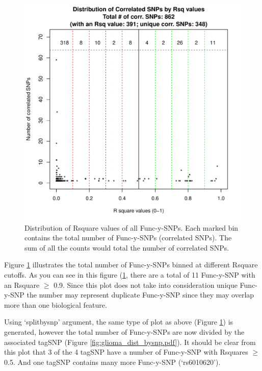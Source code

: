 \documentclass[12pt,fullpage]{article}
\begin{document}
\begin{figure}[ht!]
\begin{center}
\includegraphics{glioma_dist.pdf}
\caption{\label{fig:glioma_dist.pdf} Distribution of Rsquare values of all 
Func-y-SNPs. Each marked bin contains the total number of Func-y-SNPs
(correlated SNPs). The sum of all the counts would total the number of
correlated SNPs.}
{\footnotesize{}}
\end{center}
\end{figure}

Figure \ref{fig:glioma_dist.pdf} illustrates the total number of Func-y-SNPs
binned at different Rsquare cutoffs. As you can see in this figure
(\ref{fig:glioma_dist.pdf}, there are a total of 11 Func-y-SNP with an Rsquare
$\ge$ 0.9. Since this plot does not take into consideration unique Func-y-SNP
the number may represent duplicate Func-y-SNP since they may overlap more than
one biological feature.

Using `splitbysnp' argument, the same type of plot as above (Figure
\ref{fig:glioma_dist.pdf}) is generated, however the total number of Func-y-SNPs
are now divided by the associated tagSNP (Figure
\ref{fig:glioma_dist_bysnp.pdf}). It should be clear from this plot that 3 of
the 4 tagSNP have a number of Func-y-SNP with Rsquares $\ge$ 0.5.  And one
tagSNP contains many more Func-y-SNP (`rs6010620').
\end{document}
